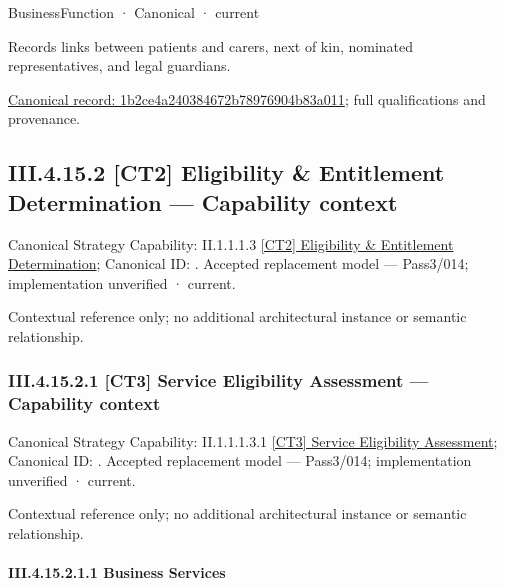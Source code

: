 \label{element:1b2ce4a240384672b78976904b83a011}
{\small BusinessFunction · Canonical · current}\par

Records links between patients and carers, next of kin, nominated representatives, and legal guardians.


{\footnotesize \href{../../../../../../../../continuum/business/business-function/1b2ce4a240384672b78976904b83a011.md}{Canonical record: 1b2ce4a240384672b78976904b83a011}; full qualifications and provenance.}\par
\subsection*{III.4.15.2 [CT2] Eligibility \& Entitlement Determination — Capability context}
\label{navigation:III.4.15.2}

{\small Canonical Strategy Capability: II.1.1.1.3 \hyperref[element:2239340b964c49bab172d8c5cf4ba4cd]{[CT2] Eligibility \& Entitlement Determination}; Canonical ID: \texttt{}. Accepted replacement model — Pass3/014; implementation unverified · current.}\par
Contextual reference only; no additional architectural instance or semantic relationship.\par
\subsubsection*{III.4.15.2.1 [CT3] Service Eligibility Assessment — Capability context}
\label{navigation:III.4.15.2.1}

{\small Canonical Strategy Capability: II.1.1.1.3.1 \hyperref[element:94d9c75393684e638e5c3b1c83ed99be]{[CT3] Service Eligibility Assessment}; Canonical ID: \texttt{}. Accepted replacement model — Pass3/014; implementation unverified · current.}\par
Contextual reference only; no additional architectural instance or semantic relationship.\par
\paragraph*{III.4.15.2.1.1 Business Services}
\label{navigation:III.4.15.2.1.1}

